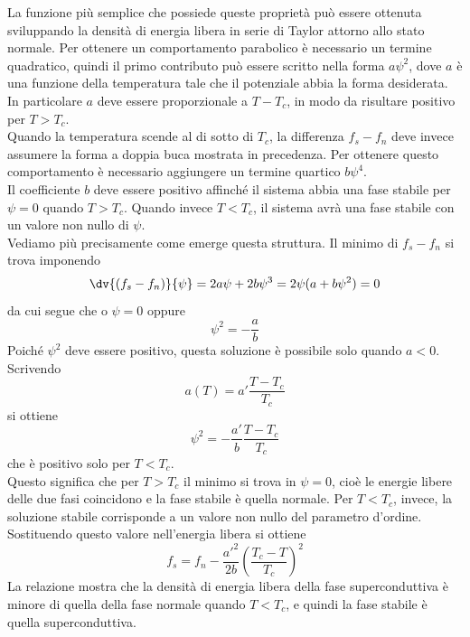 La funzione più semplice che possiede queste proprietà può essere ottenuta sviluppando la densità di energia libera in serie di Taylor attorno allo stato normale. Per ottenere un comportamento parabolico è necessario un termine quadratico, quindi il primo contributo può essere scritto nella forma $a\psi^2$, dove $a$ è una funzione della temperatura tale che il potenziale abbia la forma desiderata. In particolare $a$ deve essere proporzionale a $T-T_c$, in modo da risultare positivo per $T>T_c$.\\
Quando la temperatura scende al di sotto di $T_c$, la differenza $f_s - f_n$ deve invece assumere la forma a doppia buca mostrata in precedenza. Per ottenere questo comportamento è necessario aggiungere un termine quartico $b\psi^4$.\\
Il coefficiente $b$ deve essere positivo affinché il sistema abbia una fase stabile per $\psi=0$ quando $T>T_c$. Quando invece $T<T_c$, il sistema avrà una fase stabile con un valore non nullo di $\psi$.\\
Vediamo più precisamente come emerge questa struttura. Il minimo di $f_s - f_n$ si trova imponendo
\begin{equation*}
   \dv{(f_s-f_n)}{\psi}
   =2a\psi + 2b\psi^3
   =2\psi(a+b\psi^2)
   =0
\end{equation*}
da cui segue che o $\psi=0$ oppure
\begin{equation*}
   \psi^2=-\frac{a}{b}
\end{equation*}
Poiché $\psi^2$ deve essere positivo, questa soluzione è possibile solo quando $a<0$. Scrivendo
\begin{equation*}
   a(T)=a'\frac{T-T_c}{T_c}
\end{equation*}
si ottiene
\begin{equation*}
   \psi^2
   =-\frac{a'}{b}\frac{T-T_c}{T_c}
\end{equation*}
che è positivo solo per $T<T_c$.\\
Questo significa che per $T>T_c$ il minimo si trova in $\psi=0$, cioè le energie libere delle due fasi coincidono e la fase stabile è quella normale. Per $T<T_c$, invece, la soluzione stabile corrisponde a un valore non nullo del parametro d'ordine.\\
Sostituendo questo valore nell'energia libera si ottiene
\begin{equation}
   f_s
   =f_n - \frac{{a'}^2}{2b}\left(\frac{T_c-T}{T_c}\right)^2
   \label{eq:free_energy_ginzburg_landau}
\end{equation}
La relazione  mostra che la densità di energia libera della fase superconduttiva è minore di quella della fase normale quando $T<T_c$, e quindi la fase stabile è quella superconduttiva.\\
